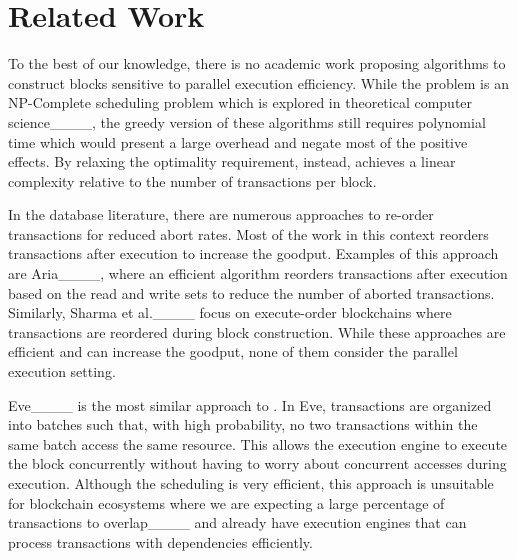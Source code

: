 \section{Related Work}
\label{sec:relatedwork}

To the best of our knowledge, there is no academic work proposing algorithms to construct blocks sensitive to parallel execution efficiency. 
While the problem is an NP-Complete scheduling problem which is explored in theoretical computer science____, the greedy version of these algorithms still requires polynomial time which would present a large overhead and negate most of the positive effects.
By relaxing the optimality requirement, instead, \sys achieves a linear complexity relative to the number of transactions per block.

In the database literature, there are numerous approaches to re-order transactions for reduced abort rates.
Most of the work in this context reorders transactions after execution to increase the goodput. Examples of this approach are Aria____, where an efficient algorithm reorders transactions after execution based on the read and write sets to reduce the number of aborted transactions. Similarly, Sharma et al.____ focus on execute-order blockchains where transactions are reordered during block construction.
While these approaches are efficient and can increase the goodput, none of them consider the parallel execution setting.

Eve____ is the most similar approach to \sys. In Eve, transactions are organized into batches such that, with high probability, no two transactions within the same batch access the same resource. This allows the execution engine to execute the block concurrently without having to worry about concurrent accesses during execution. Although the scheduling is very efficient, this approach is unsuitable for blockchain ecosystems where we are expecting a large percentage of transactions to overlap____ and already have execution engines that can process transactions with dependencies efficiently.

